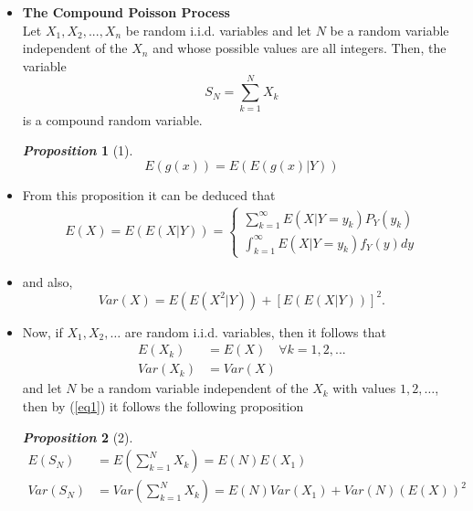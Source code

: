 \documentclass[10pt]{beamer} %
\newtheorem{prop}{{\it Proposition}}[section]
\begin{document}
\begin{frame}
    \begin{itemize}
        \item \textbf{The Compound Poisson Process}\\
        Let $X_1,X_2,...,X_n$ be random i.i.d. variables and let $N$ be a random variable independent of the $X_n$ and whose possible values are all integers. Then, the variable $$S_N=\sum_{k=1}^{N}X_k$$ is a compound random variable.\\
    
    \begin{prop}[1]
    \begin{equation}
\label{eq1}
E(g(x))=E(E(g(x)|Y))
\end{equation} 
\end{prop}
 \item From this proposition it can be deduced that
\begin{align*}
E(X)=E(E(X|Y))=\left \{ \begin{matrix} \sum_{k=1}^{\infty}E(X|Y=y_k)P_Y(y_k)
\\\int_{k=1}^{\infty}E(X|Y=y_k)f_Y(y)dy \end{matrix}\right. 
\end{align*}
\end{itemize}
    
\end{frame}
\begin{frame}
\begin{itemize}
\item and also, $$Var(X)=E(E(X^2|Y))+[E(E(X|Y))]^2.$$ 
\item Now, if $X_1,X_2,…$ are random i.i.d. variables, then it follows that
\begin{align*} 
E(X_k)&=E(X) \quad \forall k=1,2,...\\
Var(X_k)&=Var(X)
\end{align*}
and let $N$ be a random variable independent of the $X_k$ with values ${1,2,…}$, then by (\ref{eq1}) it follows the following proposition
\begin{prop}[2]
\begin{align}
E(S_N)&=E\left(\sum_{k=1}^{N}X_k\right)=E(N)E(X_1)\\
Var(S_N) &= Var\left(\sum_{k=1}^{N}X_k\right)=E(N)Var(X_1)+Var(N)(E(X))^2 \label{var}
\end{align}
\end{prop}\end{itemize}

\end{frame}
\end{document}
